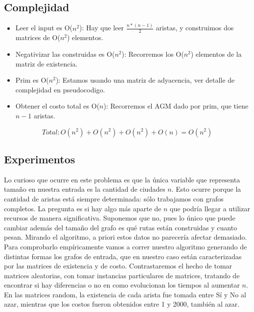 \subsection{Complejidad}

\begin{itemize}
	\item Leer el input es O($n^2$): Hay que leer $\frac{n*(n-1)}{2}$ aristas, y construimos dos matrices de O($n^2$) elementos.
	\item Negativizar las construidas es O($n^2$): Recorremos los O($n^2$) elementos de la matriz de existencia.
	\item Prim es O($n^2$): Estamos usando una matriz de adyacencia, ver detalle de complejidad en pseudocodigo.
	\item Obtener el costo total es O($n$): Recorremos el AGM dado por prim, que tiene $n-1$ aristas.
\end{itemize}

$$Total:  O(n^2) + O(n^2) + O(n^2) + O(n) = O(n^2) $$

\subsection{Experimentos}

Lo curioso que ocurre en este problema es que la única variable que representa tamaño en nuestra entrada es la cantidad de ciudades $n$. Esto ocurre porque la cantidad de aristas está siempre determinada: sólo trabajamos con grafos completos. La pregunta es si hay algo más aparte de $n$ que podría llegar a utilizar recursos de manera significativa. Suponemos que no, pues lo único que puede cambiar además del tamaño del grafo es qué rutas están construidas y cuanto pesan. Mirando el algoritmo, a priori estos datos no parecería afectar demasiado. \\

Para comprobarlo empíricamente vamos a correr nuestro algoritmo generando de distintas formas los grafos de entrada, que en nuestro caso están caracterizadas por las matrices de existencia y de costo. Contrastaremos el hecho de tomar matrices aleatorias, con tomar instancias particulares de matrices, tratando de encontrar si hay diferencias o no en como evolucionan los tiempos al aumentar $n$. \\

En las matrices random, la existencia de cada arista fue tomada entre Sí y No al azar, mientras que los costos fueron obtenidos entre 1 y 2000, también al azar. \\ 

